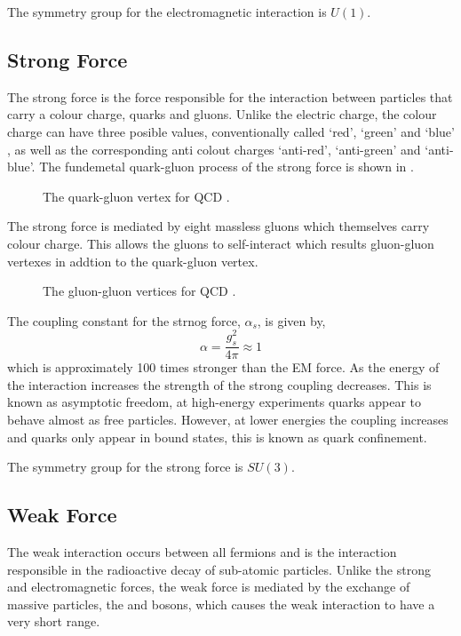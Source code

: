 The symmetry group for the electromagnetic interaction is $U(1)$. 

\subsection{Strong Force}

The strong force is the force responsible for the interaction between particles
that carry a colour charge, quarks and gluons. Unlike the electric charge, the
colour charge can have three posible values, conventionally called `red',
`green' and `blue' , as well as the corresponding anti colout charges
`anti-red', `anti-green' and `anti-blue'.
The fundemetal quark-gluon process of the strong force is shown in
.
\begin{figure}[htbp]
  \centering
  \caption{The quark-gluon vertex for \ac{QCD} .}
  \label{fig:qcdquark}
\end{figure}
The strong force is mediated by eight massless gluons which themselves carry
colour charge. This allows the gluons to self-interact which results gluon-gluon
vertexes in addtion to the quark-gluon vertex.
\begin{figure}[htbp]
  \centering
  \caption{The gluon-gluon vertices for \ac{QCD} .}
  \label{fig:qcdgluon}
\end{figure}

The coupling constant for the strnog force, $\alpha_s$, is given by,
\begin{equation}
\alpha = \frac{g_s^2}{4 \pi} \approx 1
\end{equation}
which is approximately 100 times stronger than the \ac{EM} force.
As the energy of the interaction increases the strength of the strong coupling
decreases. This is known as asymptotic freedom, at high-energy experiments
quarks appear to behave almost as free particles. However, at lower energies 
the coupling increases and quarks only appear in bound states, this is known as
quark confinement.

The symmetry group for the strong force is $SU(3)$. 

\subsection{Weak Force}
The weak interaction occurs between all fermions and is the interaction
responsible in the radioactive decay of sub-atomic particles.  Unlike the strong
and electromagnetic forces, the weak force is mediated by the exchange of
massive particles, the \PWpm and \PZ bosons, which causes the weak interaction
to have a very short range.

